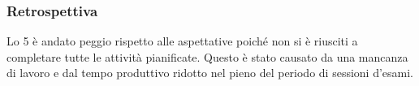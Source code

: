 \subsubsection{Retrospettiva}
\label{sec:sprint5_retrospettiva}
Lo  5 è andato peggio rispetto alle aspettative poiché non si è riusciti a completare tutte le attività pianificate. Questo è stato causato da una mancanza di lavoro e dal tempo produttivo ridotto nel pieno del periodo di sessioni d'esami. 